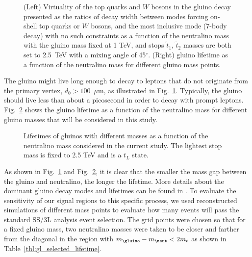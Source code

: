 \begin{figure}[htb]
\centering
{}
\caption{(Left) Virtuality of the top quarks and $W$ bosons in the
gluino decay presented as the ratios of decay width between modes
forcing on-shell top quarks or $W$ bosons, and the most inclusive mode
(7-body decay) with no such constraints as a function of the
neutralino mass with the gluino mass fixed at 1 TeV, and stops $\tilde{t}_{1}$, $\tilde{t}_{2}$
masses are both set to 2.5~TeV with a mixing angle of
45$^\circ$. (Right) gluino lifetime as a function of the neutralino
mass for different gluino mass points.}
\label{fig:virtual}
\end{figure}

\par The gluino might live long enough to decay
to leptons that do not originate from the primary vertex,
$d_0>100$~$\mu$m, as illustrated in Fig.~\ref{fig:virtual}. Typically,
the gluino should live less than about a picosecond in order to decay
with prompt leptons. Fig.~\ref{fig:gl_lifetime} shows the gluino
lifetime as a function of the neutralino mass for different gluino
masses that will be considered in this study.

\begin{figure}[h!]
\centering
{}
\caption{ Lifetimes of gluinos with different masses as a function of the neutralino mass considered in the current study. The lightest stop mass is fixed to 2.5 TeV and is a $t_L$ state.}
\label{fig:gl_lifetime}
\end{figure}

As shown in Fig.~\ref{fig:virtual} and Fig.~\ref{fig:gl_lifetime}, it
is clear that the smaller the mass gap between the gluino and
neutralino, the longer the lifetime. More details about the dominant
gluino decay modes and lifetimes can be found
in \cite{Maurer:1966089}. To evaluate the sensitivity of our signal
regions to this specific process, we used reconstructed simulations of
different mass points to evaluate how many events will pass the
standard SS/3L analysis event selection. The grid points were chosen
so that for a fixed gluino mass, two neutralino masses were taken to
be closer and farther from the diagonal in the region with
$m_{\gluino}-m_{\neut} < 2 m_t$ as shown in
Table~\ref{tbl:gl_selected_lifetime}.


